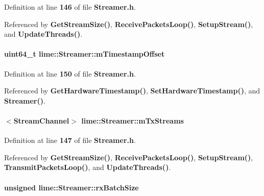 Definition at line {\bf 146} of file {\bf Streamer.\+h}.



Referenced by {\bf Get\+Stream\+Size()}, {\bf Receive\+Packets\+Loop()}, {\bf Setup\+Stream()}, and {\bf Update\+Threads()}.

\paragraph[{m\+Timestamp\+Offset}]{\setlength{\rightskip}{0pt plus 5cm}uint64\+\_\+t lime\+::\+Streamer\+::m\+Timestamp\+Offset}\label{classlime_1_1Streamer_a8c3e9262ec599581a75dc12bc3e45583}


Definition at line {\bf 150} of file {\bf Streamer.\+h}.



Referenced by {\bf Get\+Hardware\+Timestamp()}, {\bf Set\+Hardware\+Timestamp()}, and {\bf Streamer()}.

\paragraph[{m\+Tx\+Streams}]{$<${\bf Stream\+Channel}$>$ lime\+::\+Streamer\+::m\+Tx\+Streams}\label{classlime_1_1Streamer_a76ba9dc33e6bdccbda735faa6953c180}


Definition at line {\bf 147} of file {\bf Streamer.\+h}.



Referenced by {\bf Get\+Stream\+Size()}, {\bf Receive\+Packets\+Loop()}, {\bf Setup\+Stream()}, {\bf Transmit\+Packets\+Loop()}, and {\bf Update\+Threads()}.

\paragraph[{rx\+Batch\+Size}]{\setlength{\rightskip}{0pt plus 5cm}unsigned lime\+::\+Streamer\+::rx\+Batch\+Size}\label{classlime_1_1Streamer_ab9836edafedfa653415ca6ae2d8acd2e}


